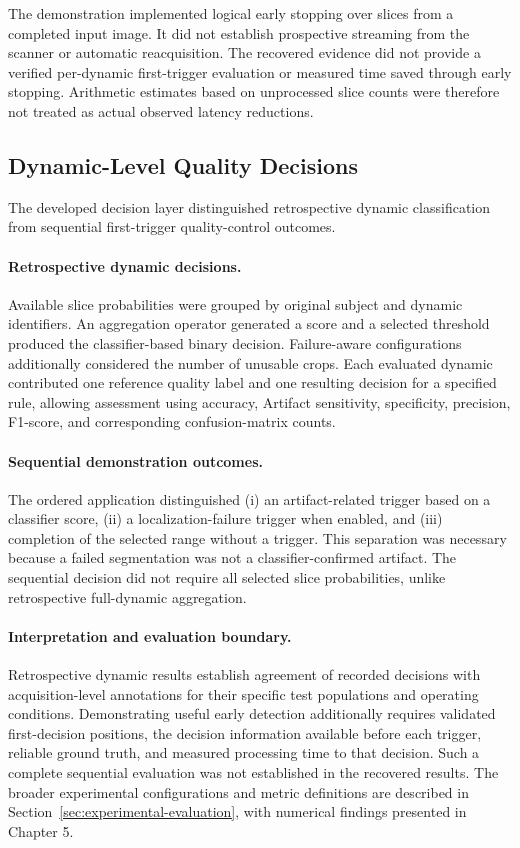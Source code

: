 The demonstration implemented logical early stopping over slices from a completed input image. It did not establish prospective streaming from the scanner or automatic reacquisition. The recovered evidence did not provide a verified per-dynamic first-trigger evaluation or measured time saved through early stopping. Arithmetic estimates based on unprocessed slice counts were therefore not treated as actual observed latency reductions.

\subsection{Dynamic-Level Quality Decisions}
\label{subsec:2d_final_dynamic_decisions}

The developed decision layer distinguished retrospective dynamic classification from sequential first-trigger quality-control outcomes.

\paragraph{Retrospective dynamic decisions.}
Available slice probabilities were grouped by original subject and dynamic identifiers. An aggregation operator generated a score and a selected threshold produced the classifier-based binary decision. Failure-aware configurations additionally considered the number of unusable crops. Each evaluated dynamic contributed one reference quality label and one resulting decision for a specified rule, allowing assessment using accuracy, Artifact sensitivity, specificity, precision, F1-score, and corresponding confusion-matrix counts.

\paragraph{Sequential demonstration outcomes.}
The ordered application distinguished (i) an artifact-related trigger based on a classifier score, (ii) a localization-failure trigger when enabled, and (iii) completion of the selected range without a trigger. This separation was necessary because a failed segmentation was not a classifier-confirmed artifact. The sequential decision did not require all selected slice probabilities, unlike retrospective full-dynamic aggregation.

\paragraph{Interpretation and evaluation boundary.}
Retrospective dynamic results establish agreement of recorded decisions with acquisition-level annotations for their specific test populations and operating conditions. Demonstrating useful early detection additionally requires validated first-decision positions, the decision information available before each trigger, reliable ground truth, and measured processing time to that decision. Such a complete sequential evaluation was not established in the recovered results. The broader experimental configurations and metric definitions are described in Section~\ref{sec:experimental-evaluation}, with numerical findings presented in Chapter 5.

